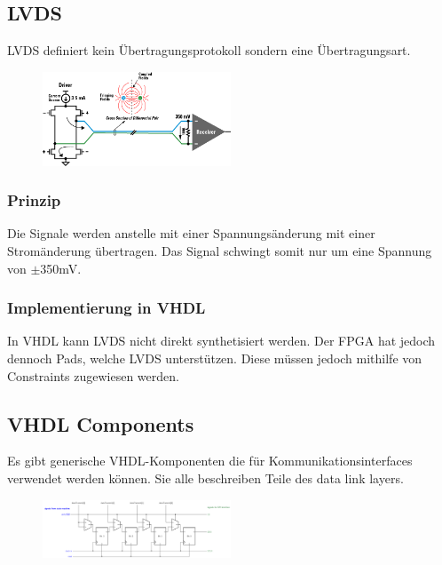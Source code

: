 \subsection{LVDS}
LVDS definiert kein Übertragungsprotokoll sondern eine Übertragungsart.
\begin{multicols}{2}
     \begin{figure}[H]
        \includegraphics[width=0.5\textwidth]{images/lvds.png}
    \end{figure}

    \subsubsection{Prinzip}
    Die Signale werden anstelle mit einer Spannungsänderung mit einer Stromänderung übertragen. Das Signal schwingt somit nur um eine Spannung von $\pm$350mV.

    \subsubsection{Implementierung in VHDL}
    In VHDL kann LVDS nicht direkt synthetisiert werden. Der FPGA hat jedoch dennoch Pads, welche LVDS unterstützen. Diese müssen jedoch mithilfe von Constraints zugewiesen werden.
    
\end{multicols}

\subsection{VHDL Components}
\begin{multicols}{2}
Es gibt generische VHDL-Komponenten die für Kommunikationsinterfaces verwendet werden können. Sie alle beschreiben Teile des data link layers.
\vfill\null
\columnbreak
\begin{figure}[H]
  \includegraphics[width=0.5\textwidth]{images/shiftRegister.png}
\end{figure}
\end{multicols}
